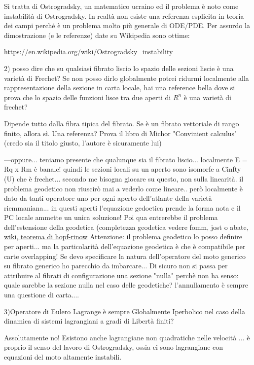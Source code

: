\documentclass[Main]{subfiles}
\begin{document}
Si tratta di Ostrogradsky, un matematico ucraino ed il problema è noto come instabilità di Ostrogradsky. In realtà non esiste una referenza esplicita in teoria dei campi perché è un problema molto più generale di ODE/PDE. Per assurdo la dimostrazione (e le referenze) date su Wikipedia sono ottime:

	\url{https://en.wikipedia.org/wiki/Ostrogradsky_instability}

     2) posso dire che su qualsiasi fibrato liscio lo spazio delle sezioni liscie è una varietà di Frechet? Se non posso dirlo globalmente potrei ridurmi localmente alla rappresentazione della sezione in carta locale, hai una reference bella dove si prova che lo spazio delle funzioni lisce tra due aperti di $R^n$ è una varietà di frechet?

Dipende tutto dalla fibra tipica del fibrato. Se è un fibrato vettoriale di rango finito, allora sì. Una referenza? Prova il libro di Michor "Convinient calculus" (credo sia il titolo giusto, l'autore è sicuramente lui)

		---oppure... teniamo presente che qualunque sia il fibrato liscio... localmente E = Rq x Rm è banale! quindi le sezioni locali su un aperto sono isomorfe a Cinfty (U) che è frechet...
		secondo me bisogna giocare su questo, non sulla linearità. il problema geodetico non riuscirò mai a vederlo come lineare.. però localmente è dato da tanti operatore uno per ogni aperto dell'atlante della varietà riemmaniana... in questi aperti l'equazione gedoetica prende la forma nota e il PC locale ammette un unica soluzione!
		Poi qua entrerebbe il problema dell'estensione della geodetica (completezza geodetica vedere fomm, jost o abate, \href{http://tinyurl.com/pcxbcqr}{wiki, teorema di hopf-rinow}
		Attenzione: il problema geodetico lo posso definire per aperti... ma la particolarità dell'equazione geodetica è che è compatibile per carte overlapping!
		Se devo specificare la natura dell'operatore del moto generico su fibrato generico ho parecchio da imbarcare... Di sicuro non si passa per attribuire al fibrati di configurazione una sezione "nulla" perchè non ha senso: quale sarebbe la sezione nulla nel caso delle geodetiche? l'annullamento è sempre una questione di carta....

     3)Operatore di Eulero Lagrange è sempre Globalmente Iperbolico nel caso della dinamica di sistemi lagrangiani a gradi di Libertà finiti?

Assolutamente no! Esistono anche lagrangiane non quadratiche nelle velocità ... è proprio il senso del lavoro di Ostrogradsky, ossia ci sono lagrangiane con equazioni del moto altamente instabili.
\end{document}
